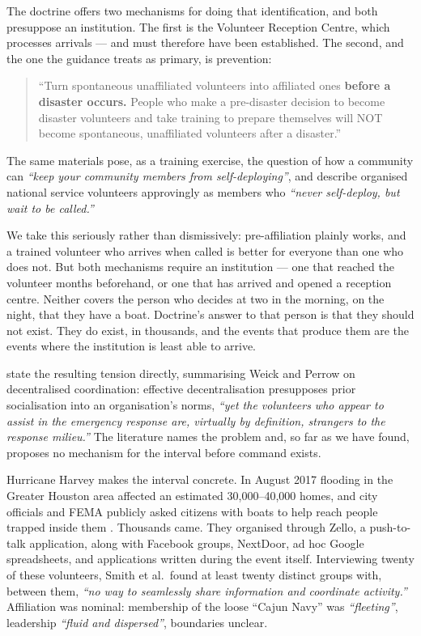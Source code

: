 The doctrine offers two mechanisms for doing that identification, and
both presuppose an institution. The first is the Volunteer Reception
Centre, which processes arrivals --- and must therefore have been
established. The second, and the one the guidance treats as primary, is
prevention:

\begin{quote}
``Turn spontaneous unaffiliated volunteers into affiliated ones
\textbf{before a disaster occurs.} People who make a pre-disaster
decision to become disaster volunteers and take training to prepare
themselves will NOT become spontaneous, unaffiliated volunteers after a
disaster.''
\end{quote}

The same materials pose, as a training exercise, the question of how a
community can \emph{``keep your community members from
self-deploying''}, and describe organised national service volunteers
approvingly as members who \emph{``never self-deploy, but wait to be
called.''}

We take this seriously rather than dismissively: pre-affiliation plainly
works, and a trained volunteer who arrives when called is better for
everyone than one who does not. But both mechanisms require an
institution --- one that reached the volunteer months beforehand, or one
that has arrived and opened a reception centre. Neither covers the
person who decides at two in the morning, on the night, that they have a
boat. Doctrine's answer to that person is that they should not exist.
They do exist, in thousands, and the events that produce them are the
events where the institution is least able to arrive.

\citet{kendra2002} state the resulting tension directly, summarising
Weick and Perrow on decentralised coordination: effective
decentralisation presupposes prior socialisation into an organisation's
norms, \emph{``yet the volunteers who appear to assist in the emergency
response are, virtually by definition, strangers to the response
milieu.''} The literature names the problem and, so far as we have
found, proposes no mechanism for the interval before command exists.

Hurricane Harvey makes the interval concrete. In August 2017 flooding in
the Greater Houston area affected an estimated 30,000--40,000 homes, and
city officials and FEMA publicly asked citizens with boats to help reach
people trapped inside them \citep{smith2018}. Thousands came. They
organised through Zello, a push-to-talk application, along with Facebook
groups, NextDoor, ad hoc Google spreadsheets, and applications written
during the event itself. Interviewing twenty of these volunteers, Smith
et al.~found at least twenty distinct groups with, between them,
\emph{``no way to seamlessly share information and coordinate
activity.''} Affiliation was nominal: membership of the loose ``Cajun
Navy'' was \emph{``fleeting''}, leadership \emph{``fluid and
dispersed''}, boundaries unclear.

